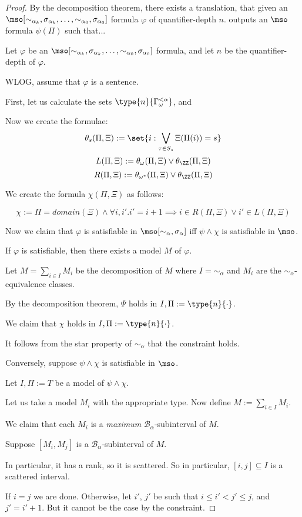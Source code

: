 \begin{proof}
  By the decomposition theorem, there exists a translation,
  that given an $\mso[\sim_{\alpha_k}, \sigma_{\alpha_k}, \ldots, \sim_{\alpha_0}, \sigma_{\alpha_0}]$ formula $\varphi$ of quantifier-depth $n$.
  outputs an $\mso$ formula $\psi(\Pi)$ such that...

  Let $\varphi$ be an $\mso[\sim_{\alpha_k}, \sigma_{\alpha_k}, \ldots, \sim_{\alpha_0}, \sigma_{\alpha_0}]$ formula,
  and let $n$ be the quantifier-depth of $\varphi$.

  WLOG, assume that $\varphi$ is a sentence.

  First, let us calculate the sets
  $\type{n}{\Gamma_{\omega}^{< \alpha}}$,
  and 

  Now we create the formulae:
  \[\theta_s(\Pi, \Xi) := \set{i : \bigvee_{\tau \in S_s}{\Xi(\Pi(i)) = s}}\]
  \[L(\Pi, \Xi) := \theta_{\omega}(\Pi, \Xi) \vee \theta_{\ZZ}(\Pi, \Xi)\]
  \[R(\Pi, \Xi) := \theta_{\omega^\ast}(\Pi, \Xi) \vee \theta_{\ZZ}(\Pi, \Xi)\]

  We create the formula $\chi(\Pi, \Xi)$ as follows:

  \[\chi := \Pi = domain(\Xi) \wedge \forall i, i'. i' = i + 1 \implies {i \in R(\Pi, \Xi) \vee i' \in L(\Pi, \Xi)}\]

  Now we claim that $\varphi$ is satisfiable in $\mso[\sim_{\alpha}, \sigma_{\alpha}]$
  iff $\psi \land \chi$ is satisfiable in $\mso$.

  If $\varphi$ is satisfiable, then there exists a model $M$ of $\varphi$.

  Let $M = \sum_{i \in I} M_i$ be the decomposition of $M$
  where $I = \sim_{\alpha}$ and $M_i$ are the $\sim_{\alpha}$-equivalence classes.

  By the decomposition theorem, $\Psi$ holds
  in $I, \Pi := \type{n}{\cdot}$.

  We claim that $\chi$ holds in $I, \Pi := \type{n}{\cdot}$.

  It follows from the star property of $\sim_{\alpha}$ that the constraint holds.

  Conversely, suppose $\psi \land \chi$ is satisfiable in $\mso$.

  Let $I, \Pi := T$ be a model of $\psi \land \chi$.

  Let us take a model $M_i$ with the appropriate type.
  Now define $M := \sum_{i \in I} M_i$.

  We claim that each $M_i$ is a \emph{maximum} $\mathcal{B}_{\alpha}$-subinterval
  of $M$.

  Suppose $[M_i, M_j]$ is a $\mathcal{B}_{\alpha}$-subinterval of $M$.

  In particular, it has a rank, so it is scattered. So in particular,
  $[i, j] \subseteq I$ is a scattered interval.

  If $i = j$ we are done. Otherwise, let $i'$, $j'$ be such that $i \le i' < j' \le j$,
  and $j' = i' + 1$.  But it cannot be the case by the constraint.

\end{proof}

